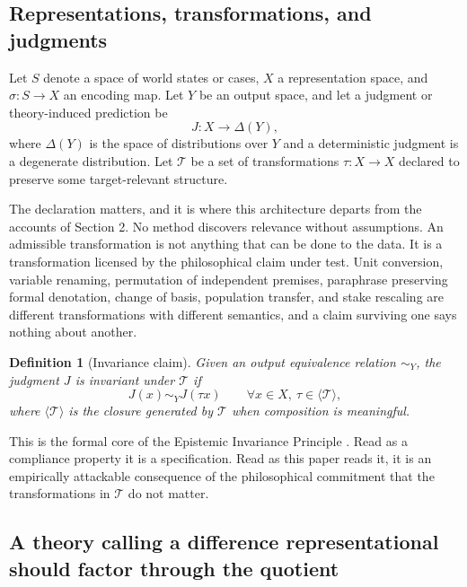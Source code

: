 \documentclass[11pt]{article}
\newtheorem{definition}{Definition}
\theoremstyle{remark}
\begin{document}
\subsection{Representations, transformations, and judgments}

Let $S$ denote a space of world states or cases, $X$ a representation space, and
$\sigma : S \to X$ an encoding map. Let $Y$ be an output space, and let a judgment
or theory-induced prediction be
\begin{equation}
J : X \to \Delta(Y),
\end{equation}
where $\Delta(Y)$ is the space of distributions over $Y$ and a deterministic
judgment is a degenerate distribution. Let $\mathcal{T}$ be a set of transformations
$\tau : X \to X$ declared to preserve some target-relevant structure.

The declaration matters, and it is where this architecture departs from the
accounts of Section 2. No method discovers relevance without assumptions. An
admissible transformation is not anything that can be done to the data. It is a
transformation licensed by the philosophical claim under test. Unit conversion,
variable renaming, permutation of independent premises, paraphrase preserving
formal denotation, change of basis, population transfer, and stake rescaling are
different transformations with different semantics, and a claim surviving one says
nothing about another.

\begin{definition}[Invariance claim]
Given an output equivalence relation $\sim_Y$, the judgment $J$ is invariant under
$\mathcal{T}$ if
\begin{equation}
J(x) \sim_Y J(\tau x) \qquad \forall x \in X, \ \tau \in \langle \mathcal{T} \rangle,
\end{equation}
where $\langle \mathcal{T} \rangle$ is the closure generated by $\mathcal{T}$ when
composition is meaningful.
\end{definition}

This is the formal core of the Epistemic Invariance Principle \citep{bond2026pe}.
Read as a compliance property it is a specification. Read as this paper reads it,
it is an empirically attackable consequence of the philosophical commitment that
the transformations in $\mathcal{T}$ do not matter.

\subsection{A theory calling a difference representational should factor through the quotient}
\end{document}
